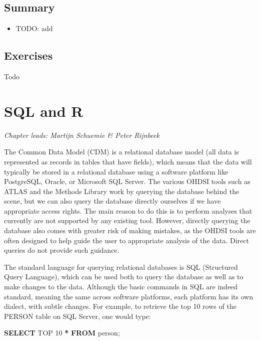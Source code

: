 \documentclass[11pt]{book}
\newenvironment{Shaded}{\begin{snugshade}}{\end{snugshade}}
\newcommand{\DecValTok}[1]{\textcolor[rgb]{0.00,0.00,0.81}{#1}}
\newcommand{\KeywordTok}[1]{\textcolor[rgb]{0.13,0.29,0.53}{\textbf{#1}}}
\newcommand{\NormalTok}[1]{#1}
\newcommand{\OperatorTok}[1]{\textcolor[rgb]{0.81,0.36,0.00}{\textbf{#1}}}
\providecommand{\tightlist}{%
  \setlength{\itemsep}{0pt}\setlength{\parskip}{0pt}}
\theoremstyle{definition}
\theoremstyle{definition}
\theoremstyle{definition}
\theoremstyle{remark}
\let\BeginKnitrBlock\begin \let\EndKnitrBlock\end
\begin{document}
\hypertarget{summary-5}{%
\section{Summary}\label{summary-5}}

\BeginKnitrBlock{rmdsummary}
\begin{itemize}
\tightlist
\item
  TODO: add
\end{itemize}
\EndKnitrBlock{rmdsummary}

\hypertarget{exercises}{%
\section{Exercises}\label{exercises}}

Todo

\hypertarget{SqlAndR}{%
\chapter{SQL and R}\label{SqlAndR}}

\emph{Chapter leads: Martijn Schuemie \& Peter Rijnbeek}

The Common Data Model (CDM) is a relational database model (all data is represented as records in tables that have fields), which means that the data will typically be stored in a relational database using a software platform like PostgreSQL, Oracle, or Microsoft SQL Server. The various OHDSI tools such as ATLAS and the Methods Library work by querying the database behind the scene, but we can also query the database directly ourselves if we have appropriate access rights. The main reason to do this is to perform analyses that currently are not supported by any existing tool. However, directly querying the database also comes with greater risk of making mistakes, as the OHDSI tools are often designed to help guide the user to appropriate analysis of the data. Direct queries do not provide such guidance.

The standard language for querying relational databases is SQL (Structured Query Language), which can be used both to query the database as well as to make changes to the data. Although the basic commands in SQL are indeed standard, meaning the same across software platforms, each platform has its own dialect, with subtle changes. For example, to retrieve the top 10 rows of the PERSON table on SQL Server, one would type:  

\begin{Shaded}
\begin{Highlighting}[]
\KeywordTok{SELECT}\NormalTok{ TOP }\DecValTok{10} \OperatorTok{*} \KeywordTok{FROM}\NormalTok{ person;}
\end{Highlighting}
\end{Shaded}
\end{document}
